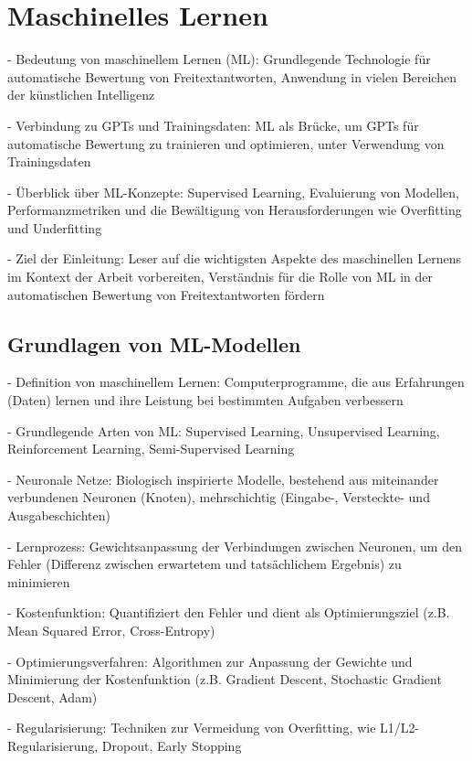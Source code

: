 \section{Maschinelles Lernen}

- Bedeutung von maschinellem Lernen (ML): Grundlegende Technologie für automatische Bewertung von Freitextantworten, Anwendung in vielen Bereichen der künstlichen Intelligenz

- Verbindung zu GPTs und Trainingsdaten: ML als Brücke, um GPTs für automatische Bewertung zu trainieren und optimieren, unter Verwendung von Trainingsdaten

- Überblick über ML-Konzepte: Supervised Learning, Evaluierung von Modellen, Performanzmetriken und die Bewältigung von Herausforderungen wie Overfitting und Underfitting

- Ziel der Einleitung: Leser auf die wichtigsten Aspekte des maschinellen Lernens im Kontext der Arbeit vorbereiten, Verständnis für die Rolle von ML in der automatischen Bewertung von Freitextantworten fördern

\subsection{Grundlagen von ML-Modellen}

- Definition von maschinellem Lernen: Computerprogramme, die aus Erfahrungen (Daten) lernen und ihre Leistung bei bestimmten Aufgaben verbessern

- Grundlegende Arten von ML: Supervised Learning, Unsupervised Learning, Reinforcement Learning, Semi-Supervised Learning

- Neuronale Netze: Biologisch inspirierte Modelle, bestehend aus miteinander verbundenen Neuronen (Knoten), mehrschichtig (Eingabe-, Versteckte- und Ausgabeschichten)

- Lernprozess: Gewichtsanpassung der Verbindungen zwischen Neuronen, um den Fehler (Differenz zwischen erwartetem und tatsächlichem Ergebnis) zu minimieren

- Kostenfunktion: Quantifiziert den Fehler und dient als Optimierungsziel (z.B. Mean Squared Error, Cross-Entropy)

- Optimierungsverfahren: Algorithmen zur Anpassung der Gewichte und Minimierung der Kostenfunktion (z.B. Gradient Descent, Stochastic Gradient Descent, Adam)

- Regularisierung: Techniken zur Vermeidung von Overfitting, wie L1/L2-Regularisierung, Dropout, Early Stopping

